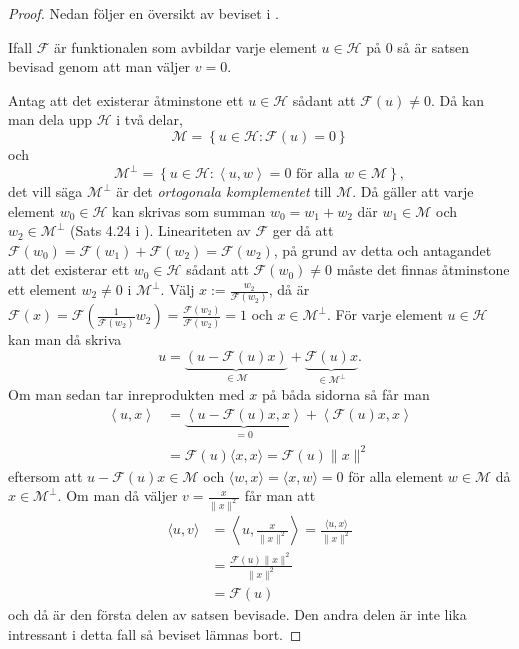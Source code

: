 \documentclass[a4paper, 12pt]{report}
\theoremstyle{definition}
\theoremstyle{remark}
\begin{document}
\begin{proof}
	Nedan följer en översikt av beviset i \cite{Young}.
	
	Ifall $\mathcal{F}$ är funktionalen som avbildar varje element $u\in\mathcal{H}$ på 0 så är satsen bevisad genom att man väljer $v=0$. 
	
	Antag att det existerar åtminstone ett $u\in\mathcal{H}$ sådant att $\mathcal{F}\left(u\right)\neq0$. Då kan man dela upp $\mathcal{H}$ i två delar,
	\begin{equation*}
		\mathcal{M} = \left\{u\in\mathcal{H}:\mathcal{F}\left(u\right)=0\right\}
	\end{equation*}
	och
	\begin{equation*}
		\mathcal{M}^\perp = \left\{u\in\mathcal{H}: \left\langle u,w \right\rangle=0\text{ för alla }w \in \mathcal{M}\right\},
	\end{equation*}
	det vill säga $\mathcal{M}^\perp$ är det \emph{ortogonala komplementet} till $\mathcal{M}$.
	Då gäller att varje element $w_0\in \mathcal{H}$ kan skrivas som summan $w_0 = w_1 + w_2$ där $w_1\in\mathcal{M}$ och $w_2\in \mathcal{M}^\perp$ (Sats 4.24 i \cite{Young}). Lineariteten av $\mathcal{F}$ ger då att $\mathcal{F}\left(w_0\right)=\mathcal{F}\left(w_1\right)+\mathcal{F}\left(w_2\right)=\mathcal{F}\left(w_2\right)$, på grund av detta och antagandet att det existerar ett $w_0\in\mathcal{H}$ sådant att $\mathcal{F}\left(w_0\right)\neq0$ måste det finnas åtminstone ett element $w_2 \neq 0$ i $\mathcal{M}^\perp$. Välj $x:= \frac{w_2}{\mathcal{F}\left(w_2\right)}$, då är $\mathcal{F}\left(x\right)=\mathcal{F}\left(\frac{1}{\mathcal{F}\left(w_2\right)}w_2\right)=\frac{\mathcal{F}\left(w_2\right)}{\mathcal{F}\left(w_2\right)}=1$ och $x\in\mathcal{M}^\perp$.
	För varje element $u\in\mathcal{H}$ kan man då skriva
	\begin{equation*}
		u=\underbrace{\left(u-\mathcal{F}\left(u\right)x \right)}_{\in\mathcal{M}} + \underbrace{\mathcal{F}\left(u\right)x}_{\in \mathcal{M}^\perp}.
	\end{equation*}
	Om man sedan tar inreprodukten med $x$ på båda sidorna så får man
	\begin{align*}
		\left\langle u,x \right\rangle &= \underbrace{\left\langle u-\mathcal{F}\left(u\right)x ,x \right\rangle}_{=0} + \left\langle \mathcal{F}\left(u\right)x,x \right\rangle\\
		&= \mathcal{F}\left(u\right)\langle x, x\rangle=\mathcal{F}\left(u\right)\|x\|^2
	\end{align*}
	eftersom att $u-\mathcal{F}\left(u\right)x\in\mathcal{M}$ och $\langle w, x \rangle=\langle x,w\rangle=0$ för alla element $w\in \mathcal{M}$ då $x\in\mathcal{M}^\perp$. Om man då väljer $v=\frac{x}{\|x\|^2}$ får man att
	\begin{align*}
		\langle u,v \rangle &= \left\langle u , \frac{x}{\|x\|^2}\right\rangle= \frac{\langle u, x\rangle}{\|x\|^2}\\
		&= \frac{\mathcal{F}\left(u\right)\|x\|^2}{\|x\|^2}\\
		&= \mathcal{F}\left(u\right)
	\end{align*}
	och då är den första delen av satsen bevisade. Den andra delen är inte lika intressant i detta fall så beviset lämnas bort.
\end{proof}
\end{document}
